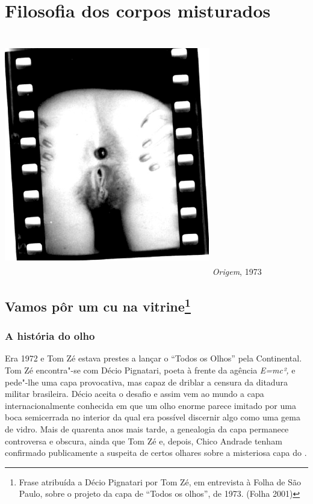 \chapter{Filosofia dos corpos misturados}

\begin{center}
\includegraphics[width=9cm,height=10.6cm]{Imgs/img6.jpg}
\emph{Origem}, 1973
\end{center}

\section*{Vamos pôr um cu na vitrine\protect\footnote{\MakeUppercase{F}rase
  atribuída a \MakeUppercase{D}écio \MakeUppercase{P}ignatari por \MakeUppercase{T}om \MakeUppercase{Z}é, em entrevista à \MakeUppercase{F}olha
  de \MakeUppercase{S}ão \MakeUppercase{P}aulo, sobre o projeto da capa de ``\MakeUppercase{T}odos os olhos'',
  de 1973. (\MakeUppercase{F}olha 2001)}}

\subsection{A história do olho}

Era 1972 e Tom Zé estava prestes a lançar o
 ``Todos os Olhos'' pela Continental. Tom Zé encontra"-se com Décio
Pignatari, poeta à frente da agência \emph{E=mc²,} e pede"-lhe uma capa
provocativa, mas capaz de driblar a censura da ditadura militar
brasileira. Décio aceita o desafio e assim vem ao mundo a capa
internacionalmente conhecida em que um olho enorme parece imitado por
uma boca semicerrada no interior da qual era possível discernir algo
como uma gema de vidro. Mais de quarenta anos mais tarde, a genealogia
da capa permanece controversa e obscura, ainda que Tom Zé e, depois,
Chico Andrade tenham confirmado publicamente a suspeita de certos
olhares sobre a misteriosa capa do .

